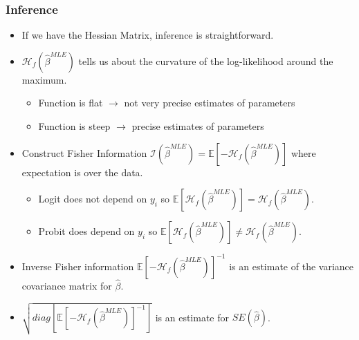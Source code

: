 \documentclass[aspectratio=169]{beamer}
\begin{document}
%
%

\begin{frame}
\frametitle{Inference}
\begin{itemize} 
\item If we have the Hessian Matrix, inference is straightforward.
\item $\mathcal{H}_f(\hat{\beta}^{MLE})$ tells us about the \alert{curvature} of the log-likelihood around the maximum.
\begin{itemize}
\item Function is flat $\rightarrow$ not very precise estimates of parameters
\item Function is steep $\rightarrow$  precise estimates of parameters
\end{itemize}
\item Construct \alert{Fisher Information} $\mathcal{I}(\hat{\beta}^{MLE}) = \mathbb{E}[-\mathcal{H}_f(\hat{\beta}^{MLE})]$ where expectation is over the data.
\begin{itemize}
\item Logit does not depend on $y_i$ so $\mathbb{E}[\mathcal{H}_f(\hat{\beta}^{MLE})]=\mathcal{H}_f(\hat{\beta}^{MLE})$.
\item Probit does depend on $y_i$ so $\mathbb{E}[\mathcal{H}_f(\hat{\beta}^{MLE})]\neq \mathcal{H}_f(\hat{\beta}^{MLE})$.
\end{itemize}
\item Inverse Fisher information $\mathbb{E}[-\mathcal{H}_f(\hat{\beta}^{MLE})]^{-1}$ is an estimate of the variance covariance matrix for $\hat{\beta}$.
\item $\sqrt{diag[\mathbb{E}[-\mathcal{H}_f(\hat{\beta}^{MLE})]^{-1}]}$ is an estimate for $SE(\hat{\beta})$.
\end{itemize}
\end{frame}
\end{document}
